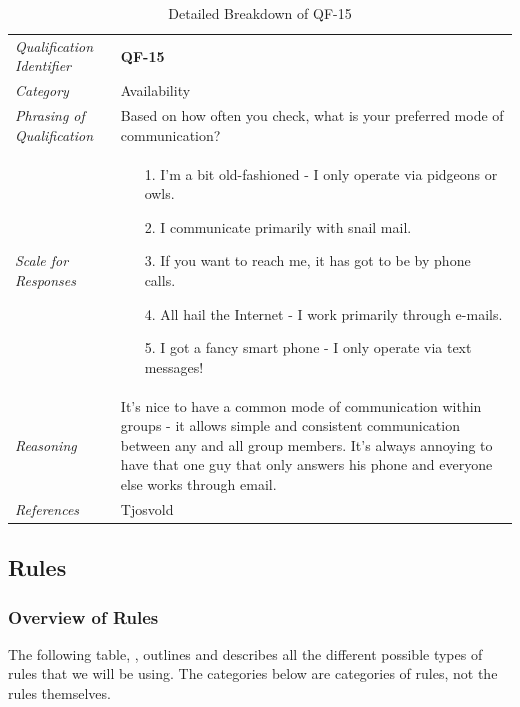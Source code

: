 \documentclass[12pt,letterpaper]{article}
\begin{document}
\begin{table}[H]
	\caption{Detailed Breakdown of QF-15}
	\begin{tabu} to 
		\toprule
		Qualification Identifier & {\bf QF-15}\\
		Category & Availability \\
		Phrasing of Qualification & Based on how often you check, what is your preferred mode of communication? \\
		Scale for Responses &
		\begin{minipage}[t]{\linewidth}
			\begin{enumerate}
				\item[1.] I'm a bit old-fashioned - I only operate via pidgeons or owls.
				\item[2.] I communicate primarily with snail mail.
				\item[3.] If you want to reach me, it has got to be by phone calls.
				\item[4.] All hail the Internet - I work primarily through e-mails.
				\item[5.] I got a fancy smart phone - I only operate via text messages!
			\end{enumerate}
		\end{minipage}\\
		Reasoning & It's nice to have a common mode of communication within groups - it allows simple and consistent communication between any and all group members. It's always annoying to have that one guy that only answers his phone and everyone else works through email.\\
		References & Tjosvold\cite{tjosvold}\\
		\toprule
	\end{tabu}
\end{table}

\subsection{Rules}
\subsubsection{Overview of Rules}

The following table, , outlines and describes all the different possible types of rules that we will be using. The categories below are categories of rules, not the rules themselves.
\end{document}
